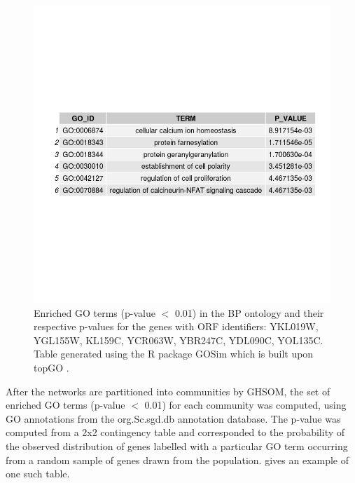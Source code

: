\documentclass{report}
\begin{document}
	\begin{figure}
		\centering
		\includegraphics[width=\textwidth]{../enriched_go_terms.png}
		\caption{Enriched GO terms (p-value $<$ 0.01) in the BP ontology and their respective p-values for the genes with ORF identifiers: YKL019W, YGL155W, KL159C, YCR063W, YBR247C, YDL090C, YOL135C. Table generated using the R package GOSim \protect\cite{frohlich2007gosim} which is built upon topGO \protect\cite{alexa2010topgo}.} 
		\label{gosim_enriched_gos}
	\end{figure}
	
	After the networks are partitioned into communities by GHSOM, the set of enriched GO terms (p-value $<$ 0.01) for each community was computed, using GO annotations from the org.Sc.sgd.db annotation database. The p-value was computed from a 2x2 contingency table and corresponded to the probability of the observed distribution of genes labelled with a particular GO term occurring from a random sample of genes drawn from the population.  gives an example of one such table.
\end{document}
